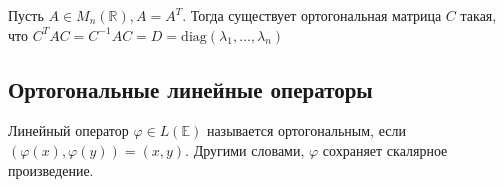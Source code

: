 \begin{Consequence}
	Пусть $A\in M_n(\mathbb{R}), A = A^T$. Тогда существует ортогональная матрица $C$ такая, что $C^TAC = C^{-1} AC = D = \mathrm{diag}(\lambda_1, \ldots, \lambda_n)$
\end{Consequence}

\subsection{Ортогональные линейные операторы}

\begin{Def}
	Линейный оператор $\varphi \in L(\mathbb{E})$ называется ортогональным, если $(\varphi(x), \varphi(y)) = (x,y)$. Другими словами, $\varphi$ сохраняет скалярное произведение.
\end{Def}


